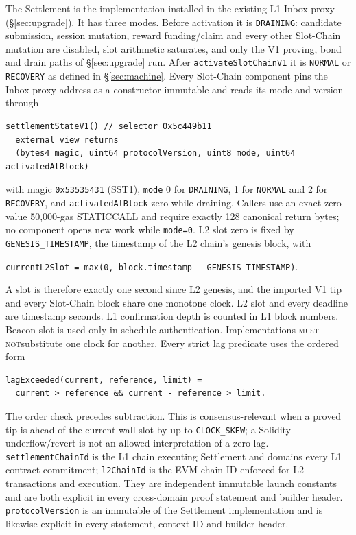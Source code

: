 \documentclass[a4paper,11pt]{article}
\newcommand{\code}[1]{\nolinkurl{#1}}
\newcommand{\mustnot}{\textsc{must not}}
\begin{document}
The Settlement is the implementation installed in the existing L1 Inbox proxy
(\S\ref{sec:upgrade}).  It has three modes.  Before activation it is
\code{DRAINING}: candidate submission, session mutation, reward funding/claim
and every other Slot-Chain mutation are disabled, slot arithmetic saturates,
and only the V1 proving, bond and drain paths of \S\ref{sec:upgrade} run.
After \code{activateSlotChainV1} it is \code{NORMAL} or \code{RECOVERY} as
defined in \S\ref{sec:machine}.  Every Slot-Chain component pins the Inbox
proxy address as a constructor immutable and reads its mode and version through
\begin{verbatim}
settlementStateV1() // selector 0x5c449b11
  external view returns
  (bytes4 magic, uint64 protocolVersion, uint8 mode, uint64 activatedAtBlock)
\end{verbatim}
with magic \code{0x53535431} (SST1), \code{mode} 0 for \code{DRAINING}, 1 for
\code{NORMAL} and 2 for \code{RECOVERY}, and \code{activatedAtBlock} zero while
draining.  Callers use an exact zero-value 50,000-gas STATICCALL and require
exactly 128 canonical return bytes; no component opens new work while
\code{mode=0}.
L2 slot zero is fixed by \code{GENESIS_TIMESTAMP}, the timestamp of the L2
chain's genesis block, with
\begin{center}
\code{currentL2Slot = max(0, block.timestamp - GENESIS_TIMESTAMP)}.
\end{center}
A slot is therefore exactly one second since L2 genesis, and the imported V1
tip and every Slot-Chain block share one monotone clock.
L2 slot and every deadline are timestamp seconds.  L1 confirmation depth is
counted in L1 block numbers.  Beacon slot is used only in schedule
authentication.  Implementations \mustnot substitute one clock for another.
Every strict lag predicate uses the ordered form
\begin{verbatim}
lagExceeded(current, reference, limit) =
  current > reference && current - reference > limit.
\end{verbatim}
The order check precedes subtraction.  This is consensus-relevant when a proved
tip is ahead of the current wall slot by up to \code{CLOCK_SKEW}; a Solidity
underflow/revert is not an allowed interpretation of a zero lag.
\code{settlementChainId} is the L1 chain executing Settlement and domains every
L1 contract commitment; \code{l2ChainId} is the EVM chain ID enforced for L2
transactions and execution.  They are independent immutable launch constants
and are both explicit in every cross-domain proof statement and builder header.
\code{protocolVersion} is an immutable of the Settlement implementation and is
likewise explicit in every statement, context ID and builder header.
\end{document}
